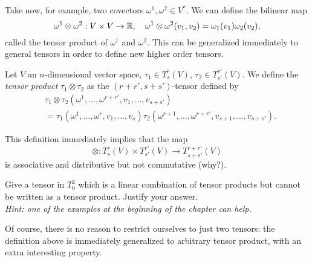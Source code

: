 Take now, for example, two covectors $\omega^1, \omega^2 \in V^*$. We can define the bilinear map
\begin{equation}
  \omega^1\otimes \omega^2 : V\times V \to \mathbb{R},\quad
  \omega^1\otimes \omega^2(v_1, v_2) = \omega_1(v_1)\omega_2(v_2),
\end{equation}
called the tensor product of $\omega^1$ and $\omega^2$.
This can be generalized immediately to general tensors in order to define new higher order tensors.

\begin{definition}
  Let $V$ an $n$-dimensional vector space, $\tau_1\in T_s^r(V)$, $\tau_2\in T_{s'}^{r'}(V)$.
  We define the \emph{tensor product} $\tau_1\otimes\tau_2$ as the $(r+r', s+s')$-tensor defined by
  \begin{align}
     & \tau_1\otimes\tau_2(\omega^1,\ldots,\omega^{r+r'}, v_1,\ldots,v_{s+s'})                                                    \\
     & = \tau_1(\omega^1,\ldots,\omega^{r}, v_1,\ldots,v_{s}) \tau_2(\omega^{r+1},\ldots,\omega^{r+r'}, v_{s+1},\ldots,v_{s+s'}).
  \end{align}
\end{definition}

This definition immediately implies that the map
\begin{equation}
  \otimes :  T_s^r(V)\times T_{s'}^{r'}(V) \to T_{s+s'}^{r+r'}(V)
\end{equation}
is associative and distributive but not commutative (why?).

\begin{exercise}
  Give a tensor in $T^2_0$ which is a linear combination of tensor products but cannot be written as a tensor product.
  Justify your answer.\\
  \textit{\small Hint: one of the examples at the beginning of the chapter can help.}
\end{exercise}

Of course, there is no reason to restrict ourselves to just two tensors: the definition above is immediately generalized to arbitrary tensor product, with an extra interesting property.

